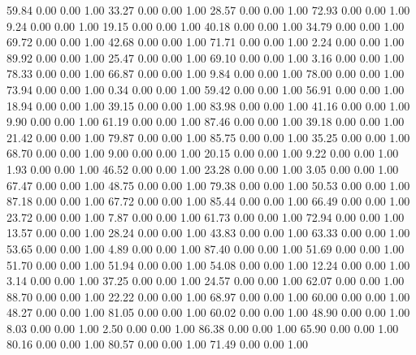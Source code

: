    59.84   0.00   0.00   1.00
   33.27   0.00   0.00   1.00
   28.57   0.00   0.00   1.00
   72.93   0.00   0.00   1.00
    9.24   0.00   0.00   1.00
   19.15   0.00   0.00   1.00
   40.18   0.00   0.00   1.00
   34.79   0.00   0.00   1.00
   69.72   0.00   0.00   1.00
   42.68   0.00   0.00   1.00
   71.71   0.00   0.00   1.00
    2.24   0.00   0.00   1.00
   89.92   0.00   0.00   1.00
   25.47   0.00   0.00   1.00
   69.10   0.00   0.00   1.00
    3.16   0.00   0.00   1.00
   78.33   0.00   0.00   1.00
   66.87   0.00   0.00   1.00
    9.84   0.00   0.00   1.00
   78.00   0.00   0.00   1.00
   73.94   0.00   0.00   1.00
    0.34   0.00   0.00   1.00
   59.42   0.00   0.00   1.00
   56.91   0.00   0.00   1.00
   18.94   0.00   0.00   1.00
   39.15   0.00   0.00   1.00
   83.98   0.00   0.00   1.00
   41.16   0.00   0.00   1.00
    9.90   0.00   0.00   1.00
   61.19   0.00   0.00   1.00
   87.46   0.00   0.00   1.00
   39.18   0.00   0.00   1.00
   21.42   0.00   0.00   1.00
   79.87   0.00   0.00   1.00
   85.75   0.00   0.00   1.00
   35.25   0.00   0.00   1.00
   68.70   0.00   0.00   1.00
    9.00   0.00   0.00   1.00
   20.15   0.00   0.00   1.00
    9.22   0.00   0.00   1.00
    1.93   0.00   0.00   1.00
   46.52   0.00   0.00   1.00
   23.28   0.00   0.00   1.00
    3.05   0.00   0.00   1.00
   67.47   0.00   0.00   1.00
   48.75   0.00   0.00   1.00
   79.38   0.00   0.00   1.00
   50.53   0.00   0.00   1.00
   87.18   0.00   0.00   1.00
   67.72   0.00   0.00   1.00
   85.44   0.00   0.00   1.00
   66.49   0.00   0.00   1.00
   23.72   0.00   0.00   1.00
    7.87   0.00   0.00   1.00
   61.73   0.00   0.00   1.00
   72.94   0.00   0.00   1.00
   13.57   0.00   0.00   1.00
   28.24   0.00   0.00   1.00
   43.83   0.00   0.00   1.00
   63.33   0.00   0.00   1.00
   53.65   0.00   0.00   1.00
    4.89   0.00   0.00   1.00
   87.40   0.00   0.00   1.00
   51.69   0.00   0.00   1.00
   51.70   0.00   0.00   1.00
   51.94   0.00   0.00   1.00
   54.08   0.00   0.00   1.00
   12.24   0.00   0.00   1.00
    3.14   0.00   0.00   1.00
   37.25   0.00   0.00   1.00
   24.57   0.00   0.00   1.00
   62.07   0.00   0.00   1.00
   88.70   0.00   0.00   1.00
   22.22   0.00   0.00   1.00
   68.97   0.00   0.00   1.00
   60.00   0.00   0.00   1.00
   48.27   0.00   0.00   1.00
   81.05   0.00   0.00   1.00
   60.02   0.00   0.00   1.00
   48.90   0.00   0.00   1.00
    8.03   0.00   0.00   1.00
    2.50   0.00   0.00   1.00
   86.38   0.00   0.00   1.00
   65.90   0.00   0.00   1.00
   80.16   0.00   0.00   1.00
   80.57   0.00   0.00   1.00
   71.49   0.00   0.00   1.00
